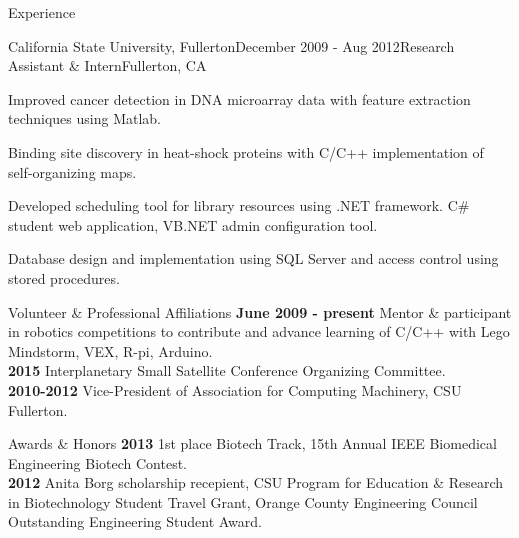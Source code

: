 \documentclass{resume} %
\begin{document}
\begin{rSection}{Experience}
\begin{rSubsection}{California State University, Fullerton}{December 2009 - Aug 2012}{Research Assistant \& Intern}{Fullerton, CA}
\item Improved cancer detection in DNA microarray data with feature extraction techniques using Matlab.
\item Binding site discovery in heat-shock proteins with C/C++ implementation of self-organizing maps.
\item Developed scheduling tool for library resources using .NET framework. C\# student web application, VB.NET admin configuration tool.
\item Database design and implementation using SQL Server and access control using stored procedures.
\end{rSubsection}

\end{rSection}


\begin{rSection}{Volunteer \& Professional Affiliations}
{\bf June 2009 - present}  Mentor \& participant in robotics competitions to contribute and advance learning of C/C++ with Lego Mindstorm, VEX, R-pi, Arduino.  \\
{\bf 2015 } Interplanetary Small Satellite Conference Organizing Committee. \\
{\bf 2010-2012} Vice-President of Association for Computing Machinery, CSU Fullerton. 
\end{rSection}




\begin{rSection}{Awards \& Honors}
{\bf 2013}  1st place Biotech Track, 15th Annual IEEE Biomedical Engineering Biotech Contest. \\
{\bf 2012} Anita Borg scholarship recepient, CSU Program for Education \& Research in Biotechnology Student Travel Grant, Orange County Engineering Council Outstanding Engineering Student Award. \\
\end{rSection}
\end{document}

